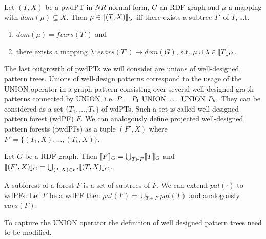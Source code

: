 \begin{lemma}
	Let $(T,X)$ be a pwdPT in $NR$ normal form, $G$ an RDF graph and $\mu$ a
	mapping with $dom(\mu) \subseteq X$. Then $\mu \in \llbracket ( T,X)\rrbracket_G$ iff
	there exists a subtree $T'$ of $T$, s.t. 
	\begin{enumerate}
		\item $dom(\mu) = fvars(T')$ and
		\item there exists a mapping $\lambda: evars(T') \mapsto dom(G)$, s.t.
			$\mu \cup \lambda \in \llbracket T \rrbracket_G$.

	\end{enumerate}
\end{lemma}

The last outgrowth of pwdPTs we will consider are unions of well-designed
pattern trees. Unions of well-design patterns correspond to the usage of the
UNION operator in a graph pattern consisting over several well-designed graph
patterns connected by UNION, i.e. $P = P_1 \mbox{ UNION } \dots \mbox{ UNION } P_k$. They can be
considered as a set $\{T_1, \dots, T_k\}$ of wdPTs. Such a set is called
well-designed pattern forest (wdPF) $F$. We can analogously define projected
well-designed pattern forests (pwdPFs) as a tuple $(F',X)$ where $F'=\{(T_1,X),\dots,(T_k,X)\}$.

\begin{definition}
Let $G$ be a RDF graph. 
Then $\llbracket F \rrbracket_G = \bigcup_{T\in F}\llbracket T \rrbracket_G$ and $\llbracket(F',X)\rrbracket_G =
\bigcup_{(T,X) \in F'} \llbracket (T,X) \rrbracket_G$. 
\end{definition}


A subforest of a forest $F$ is a set of subtrees of $F$.
We can extend $pat(\cdot)$ to wdPFs: Let $F$ be a wdPF then $pat(F) =
\cup_{T \in F}  pat(T)$ and analogously $vars(F)$.

\bigskip \noindent
To capture the UNION operator the definition of well designed pattern trees
need to be modified.  

